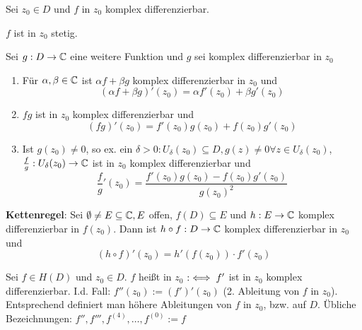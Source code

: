 \documentclass{article}
\def\gdw{\equizu}
\begin{document}
\begin{satz}
Sei $z_0 \in D$ und $f$ in $z_0$ komplex differenzierbar.
\begin{liste}
\item $f$ ist in $z_0$ stetig.
\item Sei $g: D \rightarrow \mathbb{C}$ eine weitere Funktion und $g$ sei komplex differenzierbar in $z_0$
\begin{enumerate}
\item Für $\alpha ,\beta \in \mathbb{C}$ ist $\alpha f+\beta g$ komplex differenzierbar in $z_0$ und 
$$(\alpha f+\beta g)'(z_0) = \alpha f'(z_0) + \beta g'(z_0)$$
\item $fg$ ist in $z_0$ komplex differenzierbar und 
$$(fg)'(z_0) = f'(z_0)g(z_0) + f(z_0)g'(z_0)$$
\item Ist $g(z_0) \neq 0$, so ex. ein $\delta > 0: U_\delta (z_0) \subseteq D, g(z) \neq 0 \forall z \in U_\delta (z_0)$, \\
$\frac{f}{g}: U_\delta (z_0) \rightarrow \mathbb{C}$ ist in $z_0$ komplex differenzierbar und 
$$\frac{f}{g}'(z_0) = \frac{f'(z_0)g(z_0) - f(z_0)g'(z_0)}{g(z_0)^2}$$
\end{enumerate}
\item \textbf{Kettenregel}: Sei $\emptyset \neq E \subseteq \mathbb{C}, E$ offen, $f(D) \subseteq E$ und $h: E \rightarrow \mathbb{C}$ komplex differenzierbar in $f(z_0)$. Dann ist $h\circ f: D \rightarrow \mathbb{C}$ komplex differenzierbar in $z_0$ und 
$$(h\circ f)'(z_0) = h'(f(z_0))\cdot f'(z_0)$$
\end{liste}
\end{satz}

\begin{definition}
Sei $f \in H(D)$ und $z_0 \in D$. $f$ heißt in $z_0$  $:\gdw f'$ ist in $z_0$ komplex differenzierbar. I.d. Fall: $f''(z_0):=(f')'(z_0)$ (2. Ableitung von $f$ in $z_0$). Entsprechend definiert man höhere Ableitungen von $f$ in $z_0$, bzw. auf $D$. Übliche Bezeichnungen: $f'', f''', f^{(4)},\ldots,f^{(0)}:=f$
\end{definition}
\end{document}

